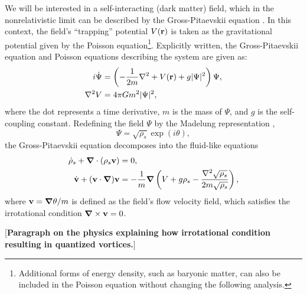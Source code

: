 \documentclass[aps,prd,twocolumn,nofootinbib,superscriptaddress]{revtex4-1}
\newcommand{\bfnab}{{\boldsymbol \nabla}}
\begin{document}
We will be interested in a self-interacting (dark matter) field, which in the nonrelativistic limit can be described by the Gross-Pitaevskii equation \cite{Hui:2016ltb}.  In this context, the field's ``trapping'' potential $V({\bf r})$ is taken as the gravitational potential given by the Poisson equation\footnote{Additional forms of energy density, such as baryonic matter, can also be included in the Poisson equation without changing the following analysis.}.  Explicitly written, the Gross-Pitaevskii equation and Poisson equations describing the system are given as:
\begin{align}
i\dot{\Psi} &= \left(-\frac{1}{2m}\nabla^2 + V({\bf r}) + g |\Psi|^2\right)\Psi, \\
\nabla^2 V &= 4\pi G m^2|\Psi|^2,
\end{align}
where the dot represents a time derivative, $m$ is the mass of $\Psi$, and $g$ is the self-coupling constant.  Redefining the field $\Psi$ by the Madelung representation \cite{Madelung},
\begin{equation}
\Psi = \sqrt{\rho_s}\exp(i\theta),
\end{equation}
the Gross-Pitaevskii equation decomposes into the fluid-like equations
\begin{align}
\dot{\rho}_s + \bfnab \cdot\left(\rho_s{\bf v}\right) &= 0,\label{Eq:Continuity}\\
\dot{\bf v} + ({\bf v}\cdot\bfnab){\bf v} &= -\frac{1}{m}\bfnab\left(V + g\rho_s - \frac{\nabla^2\sqrt{\rho_s}}{2m\sqrt{\rho_s}}\right),\label{Eq:Flow}
\end{align}
where ${\bf v} = \bfnab\theta/m$ is defined as the field's flow velocity field, which satisfies the irrotational condition $\bfnab \times {\bf v} = 0$.

[{\bf Paragraph on the physics explaining how irrotational condition resulting in quantized vortices.}]
\end{document}
